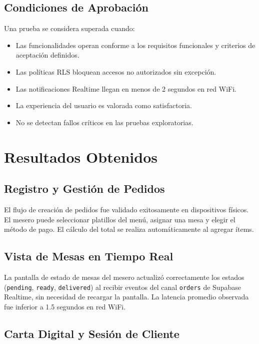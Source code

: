 \subsection{Condiciones de Aprobación}

Una prueba se considera superada cuando:
\begin{itemize}[leftmargin=1.5em]
  \item Las funcionalidades operan conforme a los requisitos funcionales
        y criterios de aceptación definidos.
  \item Las políticas RLS bloquean accesos no autorizados sin excepción.
  \item Las notificaciones Realtime llegan en menos de 2 segundos en red WiFi.
  \item La experiencia del usuario es valorada como satisfactoria.
  \item No se detectan fallos críticos en las pruebas exploratorias.
\end{itemize}

\section{Resultados Obtenidos}

\subsection{Registro y Gestión de Pedidos}

El flujo de creación de pedidos fue validado exitosamente en dispositivos físicos.
El mesero puede seleccionar platillos del menú, asignar una mesa y elegir el método
de pago. El cálculo del total se realiza automáticamente al agregar ítems.

\subsection{Vista de Mesas en Tiempo Real}

La pantalla de estado de mesas del mesero actualizó correctamente los estados
(\texttt{pending}, \texttt{ready}, \texttt{delivered}) al recibir eventos del canal
\texttt{orders} de Supabase Realtime, sin necesidad de recargar la pantalla. La
latencia promedio observada fue inferior a 1.5 segundos en red WiFi.

\subsection{Carta Digital y Sesión de Cliente}

